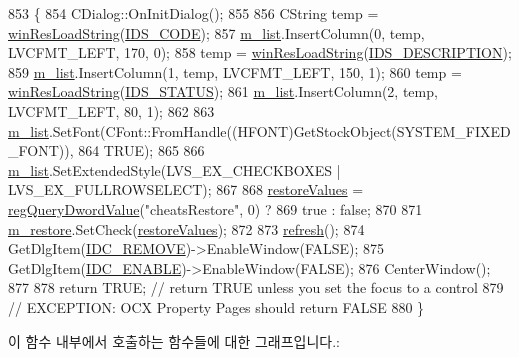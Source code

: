 \begin{DoxyCode}
853 \{
854   CDialog::OnInitDialog();
855   
856   CString temp = \mbox{\hyperlink{_win_res_util_8cpp_a416e85e80ab9b01376e87251c83d1a5a}{winResLoadString}}(\mbox{\hyperlink{resource_8h_aee47536b52a339fba2efc4f2c2a0f778}{IDS\_CODE}});
857   \mbox{\hyperlink{class_g_b_a_cheat_list_a00626f69b0783f81eaf76a4483ea76ed}{m\_list}}.InsertColumn(0, temp, LVCFMT\_LEFT, 170, 0);
858   temp = \mbox{\hyperlink{_win_res_util_8cpp_a416e85e80ab9b01376e87251c83d1a5a}{winResLoadString}}(\mbox{\hyperlink{resource_8h_a30dec8e329a793933fd5e6bdb8bcfc9b}{IDS\_DESCRIPTION}});
859   \mbox{\hyperlink{class_g_b_a_cheat_list_a00626f69b0783f81eaf76a4483ea76ed}{m\_list}}.InsertColumn(1, temp, LVCFMT\_LEFT, 150, 1);
860   temp = \mbox{\hyperlink{_win_res_util_8cpp_a416e85e80ab9b01376e87251c83d1a5a}{winResLoadString}}(\mbox{\hyperlink{resource_8h_a7357542eb0bf26af3d625a620dc96b3a}{IDS\_STATUS}});
861   \mbox{\hyperlink{class_g_b_a_cheat_list_a00626f69b0783f81eaf76a4483ea76ed}{m\_list}}.InsertColumn(2, temp, LVCFMT\_LEFT, 80, 1);
862   
863   \mbox{\hyperlink{class_g_b_a_cheat_list_a00626f69b0783f81eaf76a4483ea76ed}{m\_list}}.SetFont(CFont::FromHandle((HFONT)GetStockObject(SYSTEM\_FIXED\_FONT)),
864                  TRUE);
865 
866   \mbox{\hyperlink{class_g_b_a_cheat_list_a00626f69b0783f81eaf76a4483ea76ed}{m\_list}}.SetExtendedStyle(LVS\_EX\_CHECKBOXES | LVS\_EX\_FULLROWSELECT);  
867   
868   \mbox{\hyperlink{class_g_b_a_cheat_list_a5a6fa66317a2fdab0f9880bd2056c1d0}{restoreValues}} = \mbox{\hyperlink{_reg_8cpp_a150640889ffff4851ee26d7b999ec7c3}{regQueryDwordValue}}(\textcolor{stringliteral}{"cheatsRestore"}, 0) ?
869     true : \textcolor{keyword}{false};
870   
871   \mbox{\hyperlink{class_g_b_a_cheat_list_a4ed2a681da3265741caacda87cf36825}{m\_restore}}.SetCheck(\mbox{\hyperlink{class_g_b_a_cheat_list_a5a6fa66317a2fdab0f9880bd2056c1d0}{restoreValues}});
872   
873   \mbox{\hyperlink{class_g_b_a_cheat_list_a12928bb674926ae02d5a3ceb156a3b53}{refresh}}();
874   GetDlgItem(\mbox{\hyperlink{resource_8h_aa8441a495432bef29886eed49bbaa08c}{IDC\_REMOVE}})->EnableWindow(FALSE);
875   GetDlgItem(\mbox{\hyperlink{resource_8h_a093c54af5e55f25a680ada00f278ac80}{IDC\_ENABLE}})->EnableWindow(FALSE);
876   CenterWindow();
877   
878   \textcolor{keywordflow}{return} TRUE;  \textcolor{comment}{// return TRUE unless you set the focus to a control}
879                 \textcolor{comment}{// EXCEPTION: OCX Property Pages should return FALSE}
880 \}
\end{DoxyCode}
이 함수 내부에서 호출하는 함수들에 대한 그래프입니다.\+:
